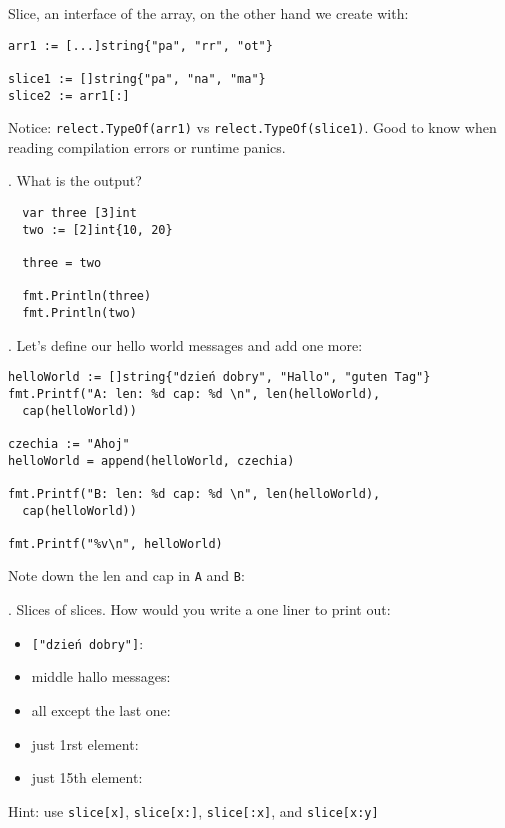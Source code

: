 \documentclass[11pt, letterpaper]{article}
\begin{document}
Slice, an interface of the array, on the other hand we create with:

\begin{verbatim}
arr1 := [...]string{"pa", "rr", "ot"}

slice1 := []string{"pa", "na", "ma"}
slice2 := arr1[:]
\end{verbatim}

Notice: \texttt{relect.TypeOf(arr1)} vs \texttt{relect.TypeOf(slice1)}. Good to know when reading compilation errors or runtime panics.

. What is the output?

\begin{verbatim}
  var three [3]int
  two := [2]int{10, 20}

  three = two

  fmt.Println(three)
  fmt.Println(two)
\end{verbatim}


. Let's define our hello world messages and add one more:

\begin{verbatim}
helloWorld := []string{"dzień dobry", "Hallo", "guten Tag"}
fmt.Printf("A: len: %d cap: %d \n", len(helloWorld),
  cap(helloWorld))

czechia := "Ahoj"
helloWorld = append(helloWorld, czechia)

fmt.Printf("B: len: %d cap: %d \n", len(helloWorld),
  cap(helloWorld))

fmt.Printf("%v\n", helloWorld)
\end{verbatim}

Note down the len and cap in \verb|A| and \verb|B|:

\bigskip
\bigskip
{}. Slices of slices. How would you write a one liner to print out:

\begin{itemize}
  \item \texttt{["dzień dobry"]}: \bigskip
  \item middle hallo messages: \bigskip
  \item all except the last one: \bigskip
  \item just 1rst element: \bigskip
  \item just 15th element: \bigskip
\end{itemize}

Hint: use \verb|slice[x]|, \verb|slice[x:]|, \verb|slice[:x]|, and \verb|slice[x:y]|
\end{document}
